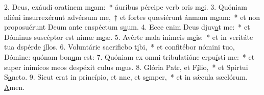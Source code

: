2. Deus, exáudi oratinem m\uline{e}am:~* áuribus pércipe verb oris m\uline{e}i.
3. Quóniam aliéni insurrexérunt advérsum me,~† et fortes quæsiérunt ánmam m\uline{e}am:~* et non proposuérunt Deum ante cnspéctum s\uline{u}um.
4. Ecce enim Deus djuv\uline{a}t me:~* et Dóminus suscéptor est nimæ m\uline{e}æ.
5. Avérte mala inimcis m\uline{e}is:~* et in veritáte tua dspérde \uline{i}llos.
6. Voluntárie sacrificbo t\uline{i}bi,~* et confitébor nómini tuo, Dómine: quónam bon\uline{u}m est:
7. Quóniam ex omni tribulatióne erpu\uline{í}sti me:~* et super inimícos meos despéxit culus m\uline{e}us.
8. Glória Patr, et F\uline{í}lio,~* et Spirtui S\uline{a}ncto.
9. Sicut erat in princípio, et nnc, et s\uline{e}mper,~* et in sǽcula sæclórum. \uline{A}men.
